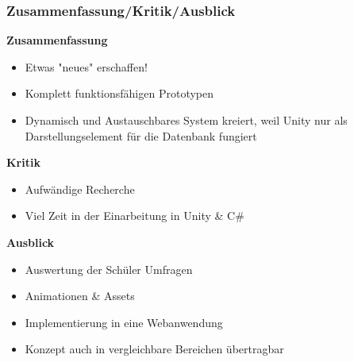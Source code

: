\documentclass{beamer}
\begin{document}

\begin{frame}
\frametitle{Zusammenfassung/Kritik/Ausblick}
\textbf{Zusammenfassung}
\begin{itemize}
\item {Etwas "neues" erschaffen!}
\item {Komplett funktionsfähigen Prototypen}
\item {Dynamisch und Austauschbares System kreiert, weil Unity nur als Darstellungselement für die Datenbank fungiert}
\end{itemize}
\textbf{Kritik}
\begin{itemize}
\item {Aufwändige Recherche}
\item {Viel Zeit in der Einarbeitung in Unity \& C\#}
\end{itemize}
\textbf{Ausblick}
\begin{itemize}
\item {Auswertung der Schüler Umfragen}
\item {Animationen \& Assets}
\item {Implementierung in eine Webanwendung}
\item {Konzept auch in vergleichbare Bereichen übertragbar}
\end{itemize}
\end{frame}
\end{document}
